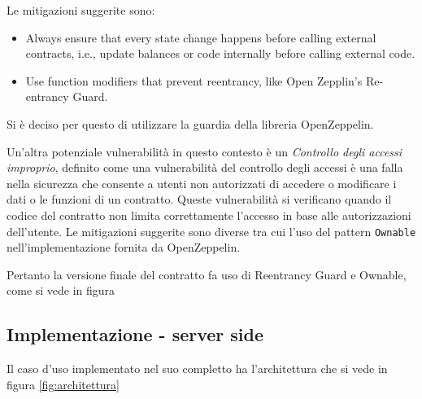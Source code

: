 \documentclass[a4paper,11pt]{article}
\begin{document}
Le mitigazioni suggerite sono:

\begin{itemize}
  \item Always ensure that every state change happens before calling external contracts, i.e., update balances or code internally before calling external code. \cite{owaspReentrancy}
  \item Use function modifiers that prevent reentrancy, like Open Zepplin’s Re-entrancy Guard. \cite{owaspReentrancy}
\end{itemize}

Si è deciso per questo di utilizzare la guardia della libreria OpenZeppelin.

Un'altra potenziale vulnerabilità in questo contesto è un \textit{Controllo degli accessi improprio}, definito come una vulnerabilità del controllo degli accessi è una falla nella sicurezza che consente a utenti non autorizzati di accedere o modificare i dati o le funzioni di un contratto. Queste vulnerabilità si verificano quando il codice del contratto non limita correttamente l'accesso in base alle autorizzazioni dell'utente. \cite{owaspOWASPSmart} Le mitigazioni suggerite sono diverse tra cui l'uso del pattern \texttt{Ownable} nell'implementazione fornita da OpenZeppelin.

Pertanto la versione finale del contratto fa uso di Reentrancy  Guard e Ownable, come si vede in figura

\subsection{Implementazione - server side}


Il caso d'uso implementato nel suo completto ha l'architettura che si vede in figura \ref{fig:architettura}
\end{document}
